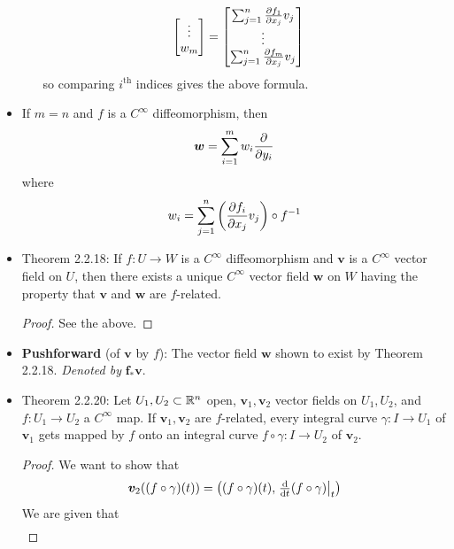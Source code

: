 \documentclass[../notes.tex]{subfiles}
\begin{document}
\begin{itemize}
\begin{itemize}
\begin{align*}
\begin{bmatrix}
                \vdots\\
                w_m\\
            \end{bmatrix}
            &=
            \begin{bmatrix}
                \sum_{j=1}^n\pdv{f_1}{x_j}v_j\\
                \vdots\\
                \sum_{j=1}^n\pdv{f_m}{x_j}v_j\\
            \end{bmatrix}
        \end{align*}
        so comparing $i^\text{th}$ indices gives the above formula.
    \end{itemize}
    \item If $m=n$ and $f$ is a $C^\infty$ diffeomorphism, then
    \begin{equation*}
        \bm{w} = \sum_{i=1}^mw_i\pdv{y_i}
    \end{equation*}
    where
    \begin{equation*}
        w_i = \sum_{j=1}^n\left( \pdv{f_i}{x_j}v_j \right)\circ f^{-1}
    \end{equation*}
    \item Theorem 2.2.18: If $f:U\to W$ is a $C^\infty$ diffeomorphism and $\bm{v}$ is a $C^\infty$ vector field on $U$, then there exists a unique $C^\infty$ vector field $\bm{w}$ on $W$ having the property that $\bm{v}$ and $\bm{w}$ are $f$-related.
    \begin{proof}
        See the above.
    \end{proof}
    \item \textbf{Pushforward} (of $\bm{v}$ by $f$): The vector field $\bm{w}$ shown to exist by Theorem 2.2.18. \emph{Denoted by} $\bm{f_*\pmb{v}}$.
    \item Theorem 2.2.20: Let $U_1,U_2\subset\mathbb{R}^n$ open, $\bm{v}_1,\bm{v}_2$ vector fields on $U_1,U_2$, and $f:U_1\to U_2$ a $C^\infty$ map. If $\bm{v}_1,\bm{v}_2$ are $f$-related, every integral curve $\gamma:I\to U_1$ of $\bm{v}_1$ gets mapped by $f$ onto an integral curve $f\circ\gamma:I\to U_2$ of $\bm{v}_2$.
    \begin{proof}
        We want to show that
        \begin{equation*}
            \bm{v}_2((f\circ\gamma)(t)) = \left( (f\circ\gamma)(t),\eval{\textstyle\dv{t}(f\circ\gamma)}_t \right)
        \end{equation*}
        We are given that
        \begin{align*}

\end{align*}
\end{proof}
\end{itemize}
\end{document}
